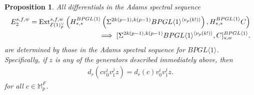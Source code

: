 \documentclass{amsart}
\newtheorem{proposition}[theorem]{Proposition}
\theoremstyle{plain}
\numberwithin{theorem}{section}
\numberwithin{equation}{section}
\numberwithin{figure}{section}
\newcommand{\mM}{{\mathbb M}}
\newcommand{\0}{\langle 0 \rangle }
\begin{document}
\begin{proposition}\label{prop:AdamsDiffernentialsAllCases}
    All differentials in the Adams spectral sequence \begin{align*}
    E_2^{s,f,w} = \textup{Ext}^{s,f,w}_{\mathcal{E}(1)^\vee_p}\left(H_{*,*}^{BPGL \langle 1 \rangle}\left(\Sigma^{2k(p-1), k(p-1)}BPGL \langle 1 \rangle^{\langle \nu_p(k!) \rangle}\right), H_{*,*}^{BPGL \langle 1 \rangle}C\right) \\
    \implies [\Sigma^{2k(p-1), k(p-1)}BPGL \langle 1 \rangle^{\langle \nu_p(k!)\rangle}, C]^{BPGL \langle 1 \rangle}_{s,w}.
    \end{align*}  are determined by those in the Adams spectral sequence for $BPGL\langle 1 \rangle$. Specifically, if $z$ is any of the generators described immediately above, then \begin{align*}
    d_r\left(cv_0^iv_1^jz\right) = d_r(c)v_0^iv_1^jz. 
    \end{align*} for all $c\in \mM_p^F$.
    

\end{proposition}
\end{document}
